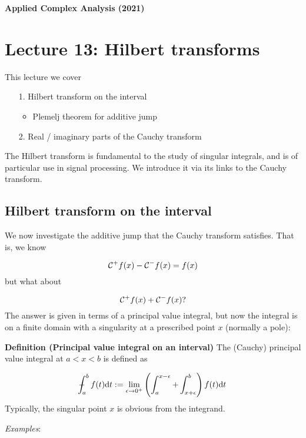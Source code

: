 \documentclass[12pt,a4paper]{article}
\def\D{ {\rm d} }
\def\CC{ {\cal C} }
\def\Xint#1{ \mathchoice
   {\XXint\displaystyle\textstyle{#1} }%
   {\XXint\textstyle\scriptstyle{#1} }%
   {\XXint\scriptstyle\scriptscriptstyle{#1} }%
   {\XXint\scriptscriptstyle\scriptscriptstyle{#1} }%
   \!\int}
\def\XXint#1#2#3{ {\setbox0=\hbox{$#1{#2#3}{\int}$}
     \vcenter{\hbox{$#2#3$}}\kern-.5\wd0} }
\def\dashint{\Xint-}
\def\dt{\D t}
\begin{document}
\textbf{Applied Complex Analysis (2021)}

\section{Lecture 13: Hilbert transforms}
This lecture we cover

\begin{itemize}
\item[1. ] Hilbert transform on the interval

\begin{itemize}
\item Plemelj theorem for additive jump

\end{itemize}

\item[2. ] Real / imaginary parts of the Cauchy transform

\end{itemize}
The Hilbert transform is fundamental to the study of singular integrals, and is of particular use in signal processing. We introduce it via its links to the Cauchy transform.

\subsection{Hilbert transform on the interval}
We now investigate the additive jump that the Cauchy transform satisfies. That is, we know

\[
    \CC^+ f(x) - \CC^- f(x) = f(x)
\]
but what about

\[
    \CC^+ f(x) + \CC^- f(x)?
\]
The answer is given in terms of a principal value integral, but now the integral is on a finite domain with a singularity at a prescribed point $x$ (normally a pole):

\textbf{Definition (Principal value integral on an interval)} The (Cauchy) principal value integral at $a < x < b$ is defined as

\[
\dashint_a^b f(t) \dt := \lim_{\epsilon \rightarrow 0^+} \left(\int_a^{x - \epsilon} + \int_{x + \epsilon}^b \right) f(t) \dt
\]
Typically, the singular point $x$ is obvious from the integrand.

\emph{Examples}:
\end{document}
